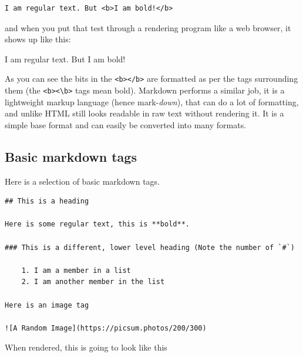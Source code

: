 \documentclass[
]{book}
\begin{document}
\begin{verbatim}
I am regular text. But <b>I am bold!</b>
\end{verbatim}

and when you put that test through a rendering program like a web browser, it shows up like this:

I am regular text. But I am bold!

As you can see the bits in the \texttt{\textless{}b\textgreater{}\textless{}/b\textgreater{}} are formatted as per the tags surrounding them (the \texttt{\textless{}b\textgreater{}\textless{}\textbackslash{}b\textgreater{}} tags mean bold). Markdown performs a similar job, it is a lightweight markup language (hence mark-\emph{down}), that can do a lot of formatting, and unlike HTML still looks readable in raw text without rendering it. It is a simple base format and can easily be converted into many formats.

\hypertarget{basic-markdown-tags}{%
\subsection{Basic markdown tags}\label{basic-markdown-tags}}

Here is a selection of basic markdown tags.

\begin{verbatim}
## This is a heading

Here is some regular text, this is **bold**.

### This is a different, lower level heading (Note the number of `#`)

    1. I am a member in a list
    2. I am another member in the list

Here is an image tag

![A Random Image](https://picsum.photos/200/300)
\end{verbatim}

When rendered, this is going to look like this
\end{document}

